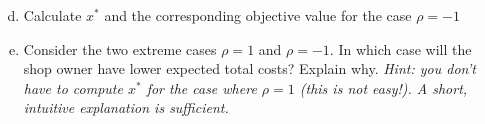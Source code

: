 \documentclass[assignments]{subfiles}
\begin{document}
\begin{exercise}
\begin{enumerate}[(a)]
    \setcounter{enumi}{3}
    \item Calculate $x^*$ and the corresponding objective value for the case $\rho = -1$
    \item Consider the two extreme cases $\rho = 1$ and $\rho = -1$. In which case will the shop owner have lower expected total costs? Explain why. \textit{Hint: you don't have to compute $x^*$ for the case where $\rho = 1$ (this is not easy!). A short, intuitive explanation is sufficient.}
\end{enumerate}

\end{exercise}
\end{document}
